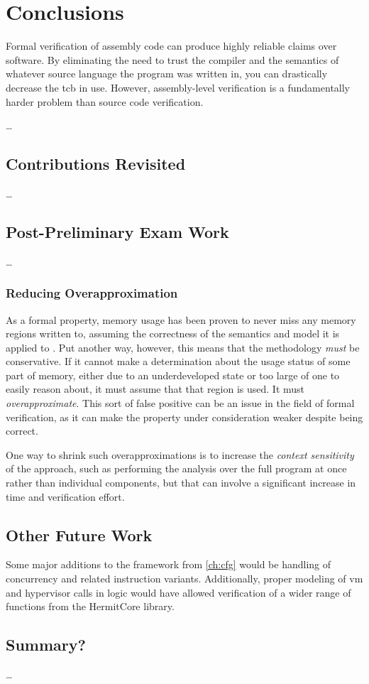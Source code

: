 \chapter{Conclusions}\label{ch:conclusions}
Formal verification of assembly code can produce highly reliable claims over software.
By eliminating the need to trust the compiler
and the semantics of whatever source language the program was written in,
you can drastically decrease the \ac{tcb} in use.
However, assembly-level verification is a fundamentally harder problem
than source code verification.

\todo\dots

\section{Contributions Revisited}
\todo\dots
\section{Post-Preliminary Exam Work}
\todo\dots

\subsection{Reducing Overapproximation}\label{mem_use_over}
As a formal property, memory usage has been proven to never miss any memory regions
written to, assuming the correctness of the semantics and model it is applied
to \autocite{bockenek2019preservation,popl2019underreview}.
Put another way, however,
this means that the methodology \emph{must} be conservative.
If it cannot make a determination about the usage status of some part of memory,
either due to an underdeveloped state or too large of one to easily reason about,
it must assume that that region is used. It must \emph{overapproximate}.%
This sort of false positive can be an issue in the field of formal verification,
as it can make the property under consideration weaker despite being correct.

One way to shrink such overapproximations is to increase the
\emph{context sensitivity}
of the approach, such as performing the analysis over the full program at once
rather than individual components, but that can involve
a significant increase in time and verification effort.


\section{Other Future Work}
Some major additions to the framework from \cref{ch:cfg}
would be handling of concurrency and related instruction variants.
Additionally, proper modeling of \ac{vm} and hypervisor calls in logic
would have allowed verification of a wider range of functions
from the HermitCore library.

\section{Summary?}
\todo\dots
